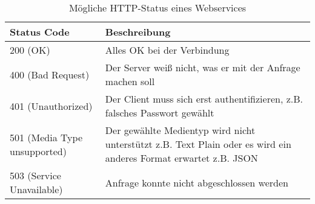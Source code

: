 \begin{table}[ht]
	\begin{tabular}{l | p{9.50 cm}}
		Status Code & Beschreibung \\
		\hline
		200 (OK) & Alles OK bei der Verbindung \\
		400 (Bad Request) & Der Server weiß nicht, was er mit der Anfrage machen soll \\
		401 (Unauthorized) & Der Client muss sich erst authentifizieren, z.B. falsches Passwort gewählt \\
		501 (Media Type unsupported) & Der gewählte Medientyp wird nicht unterstützt z.B. Text Plain oder es wird ein anderes Format erwartet z.B. JSON \\
		503 (Service Unavailable) & Anfrage konnte nicht abgeschlossen werden
	\end{tabular}
	\caption{Mögliche \acs{HTTP}-Status eines Webservices}
\label{tab:http_status}
\end{table}